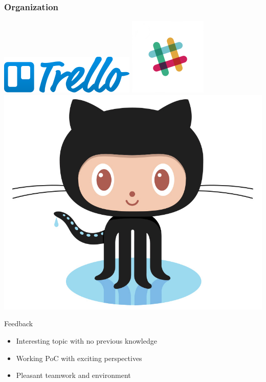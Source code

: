 \begin{frame}
	\frametitle{Organization}
	\begin{center}
	\includegraphics[scale=0.4]{figs/trello.png}
	\includegraphics[scale=0.4]{figs/slack.png}
	\includegraphics[scale=0.1]{figs/Octocat.jpg}
	\end{center}
\end{frame}


\begin{frame}{Feedback}

\begin{itemize}

\item Interesting topic with no previous knowledge

\item Working PoC with exciting perspectives

\item Pleasant teamwork and environment

\end{itemize}

\end{frame}
